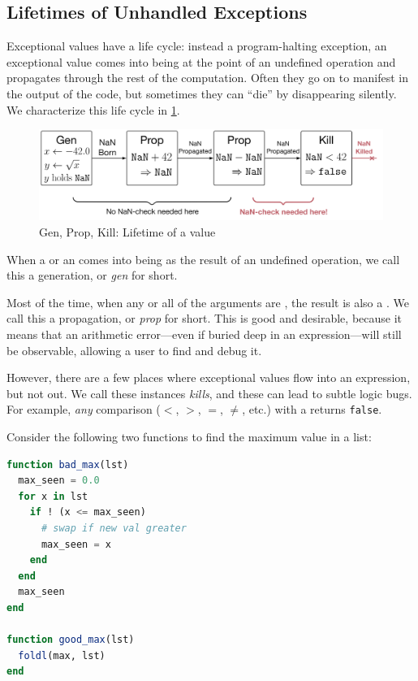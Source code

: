 \documentclass{juliacon}
\begin{document}
\subsection{Lifetimes of Unhandled Exceptions}
\label{s:to-kill-a-fp}

Exceptional values have a life cycle: instead a program-halting exception, an exceptional value comes into being at the point of an undefined operation and propagates through the rest of the computation.
Often they go on to manifest in the output of the code, but sometimes they can ``die'' by disappearing silently.
We characterize this life cycle in \cref{f:gpk}.

\begin{figure}[t]
  \includegraphics[width=\columnwidth]{fig/genpropkill-outline.png}
  \caption{Gen, Prop, Kill: Lifetime of a \NaN{} value}
  \label{f:gpk}
\end{figure}

When a \NaN{} or an \Inf{} comes into being as the result of an undefined operation, we call this a generation, or \emph{gen} for short.

Most of the time, when any or all of the arguments are \NaN{}, the result is also a \NaN{}.
We call this a propagation, or \emph{prop} for short.
This is good and desirable, because it means that an arithmetic error---even if buried deep in an expression---will still be observable, allowing a user to find and debug it.

However, there are a few places where exceptional values flow into an expression, but not out.
We call these instances \emph{kills}, and these can lead to subtle logic bugs.
For example, \emph{any} comparison ($<$, $>$, $=$, $\neq$, etc.) with a \NaN{} returns \texttt{false}.

Consider the following two functions to find the maximum value in a list:

\begin{lstlisting}[language = Julia]
function bad_max(lst)
  max_seen = 0.0
  for x in lst
    if ! (x <= max_seen)
      # swap if new val greater
      max_seen = x
    end
  end
  max_seen
end

function good_max(lst)
  foldl(max, lst)
end
\end{lstlisting}
\end{document}

